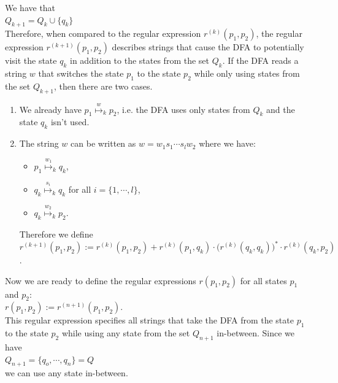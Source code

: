 \begin{enumerate}
  We have that
  \\[0.2cm]
  \hspace*{1.3cm}
  $Q_{k+1} = Q_k \cup \{q_k\}$
  \\[0.2cm]
  Therefore, when compared to the regular expression $r^{(k)}(p_1, p_2)$,
  the regular expression  $r^{(k+1)}(p_1, p_2)$ describes strings that cause the \textsc{DFA} to potentially
  visit the state  $q_k$ in addition to the states from the set $Q_k$.
  If the \textsc{DFA} reads a string $w$ that switches the state $p_1$ to the state $p_2$ while only using states
  from the set $Q_{k+1}$, then there are two cases.
  \begin{enumerate}
  \item We already have $p_1 \stackrel{w}{\mapsto}_k p_2$, i.e. the DFA uses only states from $Q_k$ and the
        state $q_{k}$ isn't used.
  \item The string $w$ can be written as  $w = w_1 s_1\cdots s_l w_2$ where we have:
        \begin{itemize}
        \item $p_1 \stackrel{w_1}{\mapsto}_k q_k$,
        \item $q_k \stackrel{s_i}{\mapsto}_k q_k$ \quad for all $i = \{ 1, \cdots, l\}$,
        \item $q_k \stackrel{w_2}{\mapsto}_k p_2$.
        \end{itemize}
        Therefore we define
        \\[0.2cm]
        \hspace*{1.3cm}
        $r^{(k+1)}(p_1,p_2) := 
         r^{(k)}(p_1,p_2) + 
         r^{(k)}(p_1,q_k) \cdot \bigl(r^{(k)}(q_k,q_k)\bigr)^* \cdot r^{(k)}(q_k,p_2)$.
  \end{enumerate}  
\end{enumerate}
Now we are ready to define the regular expressions $r(p_1,p_2)$ for all states $p_1$ and $p_2$:
\\[0.2cm]
\hspace*{1.3cm}
$r(p_1,p_2) := r^{(n+1)}(p_1,p_2)$. 
\\[0.2cm]
This regular expression specifies all strings that take the \textsc{DFA} from the state
$p_1$ to the state $p_2$ while using any state from the set 
$Q_{n+1}$ in-between.   Since we have
\\[0.2cm]
\hspace*{1.3cm}
$Q_{n+1} = \bigl\{ q_o, \cdots, q_n \} = Q$
\\[0.2cm]
we can use any state in-between.


